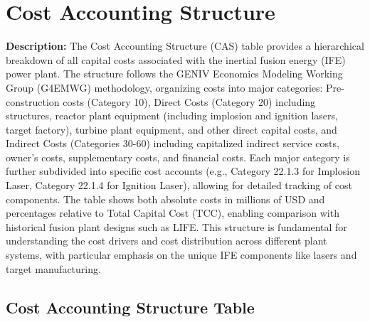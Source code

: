 \newpage 
\section{Cost Accounting Structure}

\textbf{Description:} The Cost Accounting Structure (CAS) table provides a hierarchical breakdown of all capital costs associated with the inertial fusion energy (IFE) power plant. The structure follows the GENIV Economics Modeling Working Group (G4EMWG) methodology, organizing costs into major categories: Pre-construction costs (Category 10), Direct Costs (Category 20) including structures, reactor plant equipment (including implosion and ignition lasers, target factory), turbine plant equipment, and other direct capital costs, and Indirect Costs (Categories 30-60) including capitalized indirect service costs, owner's costs, supplementary costs, and financial costs. Each major category is further subdivided into specific cost accounts (e.g., Category 22.1.3 for Implosion Laser, Category 22.1.4 for Ignition Laser), allowing for detailed tracking of cost components. The table shows both absolute costs in millions of USD and percentages relative to Total Capital Cost (TCC), enabling comparison with historical fusion plant designs such as LIFE. This structure is fundamental for understanding the cost drivers and cost distribution across different plant systems, with particular emphasis on the unique IFE components like lasers and target manufacturing.

\subsection{Cost Accounting Structure Table}

